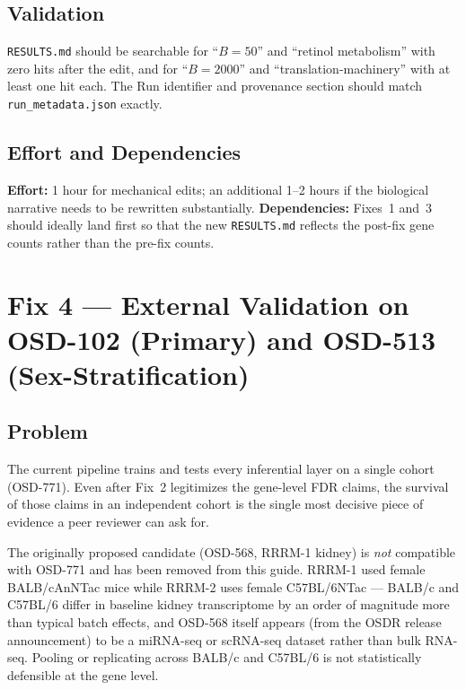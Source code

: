 \documentclass[11pt]{article}
\newcommand{\code}[1]{\texttt{#1}}
\begin{document}
\subsection{Validation}

\code{RESULTS.md} should be searchable for ``$B{=}50$'' and ``retinol metabolism'' with zero hits after the edit, and for ``$B{=}2000$'' and ``translation-machinery'' with at least one hit each. The Run identifier and provenance section should match \code{run\_metadata.json} exactly.

\subsection{Effort and Dependencies}

\textbf{Effort:} 1 hour for mechanical edits; an additional 1--2 hours if the biological narrative needs to be rewritten substantially. \textbf{Dependencies:} Fixes~1 and~3 should ideally land first so that the new \code{RESULTS.md} reflects the post-fix gene counts rather than the pre-fix counts.

\section{Fix 4 --- External Validation on OSD-102 (Primary) and OSD-513 (Sex-Stratification)}

\subsection{Problem}

The current pipeline trains and tests every inferential layer on a single cohort (OSD-771). Even after Fix~2 legitimizes the gene-level FDR claims, the survival of those claims in an independent cohort is the single most decisive piece of evidence a peer reviewer can ask for.

The originally proposed candidate (OSD-568, RRRM-1 kidney) is \emph{not} compatible with OSD-771 and has been removed from this guide. RRRM-1 used female BALB/cAnNTac mice while RRRM-2 uses female C57BL/6NTac --- BALB/c and C57BL/6 differ in baseline kidney transcriptome by an order of magnitude more than typical batch effects, and OSD-568 itself appears (from the OSDR release announcement) to be a miRNA-seq or scRNA-seq dataset rather than bulk RNA-seq. Pooling or replicating across BALB/c and C57BL/6 is not statistically defensible at the gene level.
\end{document}
